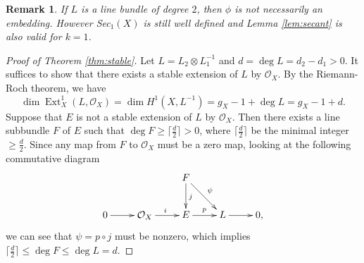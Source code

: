 \documentclass[12pt]{article}
\newtheorem{rem}{Remark}[section]
\begin{document}
\begin{rem}
\label{rem:sec1}
If $L$ is a line bundle of degree $2$, then $\phi$ is not necessarily an embedding. However {\rm Sec}$_{1}(X)$ is still well defined and Lemma \ref{lem:secant} is also valid for $k=1$.
\end{rem}

\begin{proof}[Proof of Theorem \ref{thm:stable}]
Let $L = L_{2} \otimes L_{1}^{-1}$ and $d = \deg L = d_{2} - d_{1} > 0$. It suffices to show that there exists a stable extension of $L$ by $\mathcal O_{X}$. By the Riemann-Roch theorem, we have
\[ \dim \operatorname{Ext}_{X}^{1} (L, \mathcal O_{X}) = \dim H^{1}(X, L^{-1}) = g_{X} - 1 + \deg L = g_{X} - 1 + d. \]
Suppose that $E$ is not a stable extension of $L$ by $\mathcal O_{X}$.
Then there exists a line subbundle $F$ of $E$ such that $\deg F \geq \lceil \frac{d}{2} \rceil > 0$, where $\lceil \frac{d}{2} \rceil$ be the minimal integer $\geq \frac{d}{2}$. Since any map from $F$ to $\mathcal O_{X}$ must be a zero map, looking at the following commutative diagram
\[\xymatrix{
& & F\ar[d]^{j} \ar[dr]^{\psi} & & \\
0\ar[r] & \mathcal O_{X} \ar[r]^{i} & E \ar[r] ^{p} & L \ar[r] & 0,
}\]
we can see that $\psi = p \circ j$ must be nonzero, which implies $\lceil \frac{d}{2} \rceil \leq \deg F \leq \deg L = d$.


\end{proof}
\end{document}
